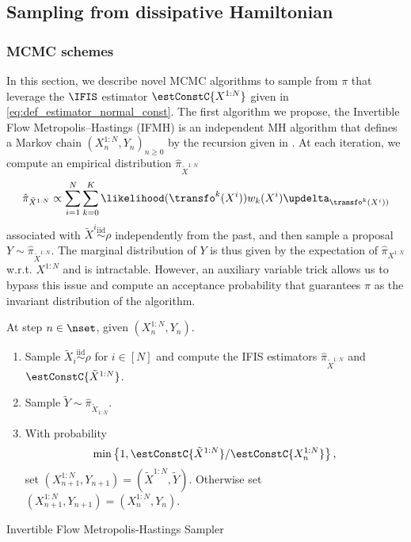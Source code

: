 \subsection{Sampling from dissipative Hamiltonian}
\subsubsection{MCMC schemes}
In this section, we describe novel MCMC algorithms to sample from $\pi$ that leverage the $\IFIS$ estimator   $\estConstC{X^{1:N}}$ given in \eqref{eq:def_estimator_normal_const}.
The first algorithm we propose, the Invertible Flow Metropolis--Hastings (IFMH) is an independent MH algorithm that defines a Markov chain $(X^{1:N}_n,Y_n)_{n \geq 0}$ by the recursion given in . At each iteration, we
compute an empirical distribution $\hat{\pi}_{\tilde{X}^{1:N}}$
\[
\hat{\pi}_{\tilde{X}^{1:N}} \propto \sum_{i=1}^{N}
  \sum_{k=0}^K\likelihood(\transfo^{k}(X^i))w_k(X^i) \updelta_{\transfo^{k}(X^i))}
\] associated with 
$\tilde{X}^{i}\overset{\text{iid}}{\sim}\rho$ independently from the past, and
then sample a proposal $Y\sim \hat{\pi}_{\tilde{X}^{1:N}}$. The marginal
distribution of $Y$ is thus given by the expectation of
$\hat{\pi}_{X^{1:N}}$ w.r.t. $X^{1:N}$ and is intractable. However, an auxiliary variable trick allows us to bypass this issue and compute an acceptance probability that guarantees $\pi$ as the invariant distribution of the algorithm.
\begin{algorithm}
At step
$n \in \nset$, given $(X^{1:N}_n,Y_n)$.
\begin{enumerate}[wide, labelwidth=!, labelindent=0pt, label=(\arabic*)]
\item Sample $\tilde{X}_i\overset{\text{iid}}{\sim} \rho$ for $i\in[N]$ and compute the IFIS estimators $\hat{\pi}_{\tilde{X}^{1:N}}$ and $\estConstC{\tilde{X}^{1:N}}$.
\item Sample $\tilde{Y}\sim \hat{\pi}_{\tilde{X}_{1:N}}$.
\item
With probability
$$\min\left\{1,\estConstC{\tilde{X}^{1:N}}/\estConstC{X^{1:N}_{n}}\right\},$$
set $(X^{1:N}_{n+1},Y_{n+1})=(\tilde{X}^{1:N},\tilde{Y})$. Otherwise set  $(X^{1:N}_{n+1},Y_{n+1})=(X^{1:N}_{n},Y_{n})$.
\end{enumerate}
\caption{Invertible Flow Metropolis-Hastings Sampler}
\label{algo:IMH}
\end{algorithm}


